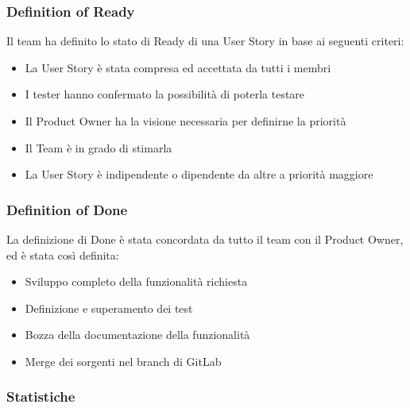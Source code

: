 \documentclass[letterpaper,10pt,italian]{sphinxmanual}
\begin{document}
\subsubsection{Definition of Ready}
\label{\detokenize{development/sprint1/index:definition-of-ready}}
\sphinxAtStartPar
Il team ha definito lo stato di Ready di una User Story in base ai seguenti criteri:
\begin{itemize}
\item {} 
\sphinxAtStartPar
La User Story è stata compresa ed accettata da tutti i membri

\item {} 
\sphinxAtStartPar
I tester hanno confermato la possibilità di poterla testare

\item {} 
\sphinxAtStartPar
Il Product Owner ha la visione necessaria per definirne la priorità

\item {} 
\sphinxAtStartPar
Il Team è in grado di stimarla

\item {} 
\sphinxAtStartPar
La User Story è indipendente o dipendente da altre a priorità maggiore

\end{itemize}


\subsubsection{Definition of Done}
\label{\detokenize{development/sprint1/index:definition-of-done}}
\sphinxAtStartPar
La definizione di Done è stata concordata da tutto il team con il Product Owner, ed è stata così definita:
\begin{itemize}
\item {} 
\sphinxAtStartPar
Sviluppo completo della funzionalità richiesta

\item {} 
\sphinxAtStartPar
Definizione e superamento dei test

\item {} 
\sphinxAtStartPar
Bozza della documentazione della funzionalità

\item {} 
\sphinxAtStartPar
Merge dei sorgenti nel branch  di GitLab

\end{itemize}


\subsubsection{Statistiche}
\label{\detokenize{development/sprint1/index:statistiche}}
\end{document}
